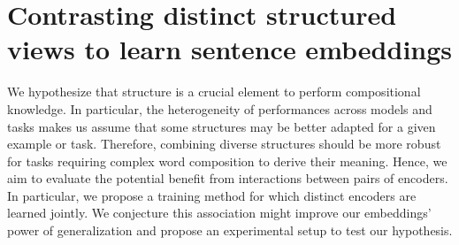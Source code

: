 \setchapterpreamble[u]{\margintoc}
\chapter{Contrasting distinct structured views to learn sentence embeddings}






We hypothesize that structure is a crucial element to perform compositional knowledge. In particular, the heterogeneity of performances across models and tasks makes us assume that some structures may be better adapted for a given example or task. Therefore, combining diverse structures should be more robust for tasks requiring complex word composition to derive their meaning. Hence, we aim to evaluate the potential benefit from interactions between pairs of encoders. In particular, we propose a training method for which distinct encoders are learned jointly. We conjecture this association might improve our embeddings' power of generalization and propose an experimental setup to test our hypothesis.

